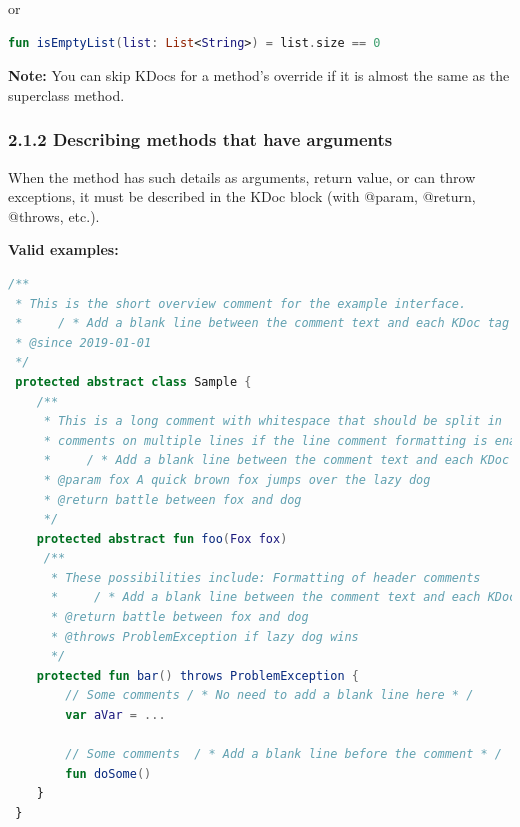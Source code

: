 or



\begin{lstlisting}[language=Kotlin]
fun isEmptyList(list: List<String>) = list.size == 0
\end{lstlisting}


\textbf{Note:} You can skip KDocs for a method's override if it is almost the same as the superclass method.



\subsubsection*{\textbf{2.1.2 Describing methods that have arguments}}
\leavevmode\newline

\label{sec:2.1.2}



When the method has such details as arguments, return value, or can throw exceptions, it must be described in the KDoc block (with @param, @return, @throws, etc.).



\textbf{Valid examples:}



\begin{lstlisting}[language=Kotlin]
/** 
 * This is the short overview comment for the example interface.
 *     / * Add a blank line between the comment text and each KDoc tag underneath * /
 * @since 2019-01-01
 */
 protected abstract class Sample {
    /**
     * This is a long comment with whitespace that should be split in 
     * comments on multiple lines if the line comment formatting is enabled.
     *     / * Add a blank line between the comment text and each KDoc tag underneath * /
     * @param fox A quick brown fox jumps over the lazy dog
     * @return battle between fox and dog 
     */
    protected abstract fun foo(Fox fox)
     /**
      * These possibilities include: Formatting of header comments
      *     / * Add a blank line between the comment text and each KDoc tag underneath * /
      * @return battle between fox and dog
      * @throws ProblemException if lazy dog wins
      */
    protected fun bar() throws ProblemException {
        // Some comments / * No need to add a blank line here * /   
        var aVar = ...

        // Some comments  / * Add a blank line before the comment * /   
        fun doSome()
    }
 }
\end{lstlisting}


